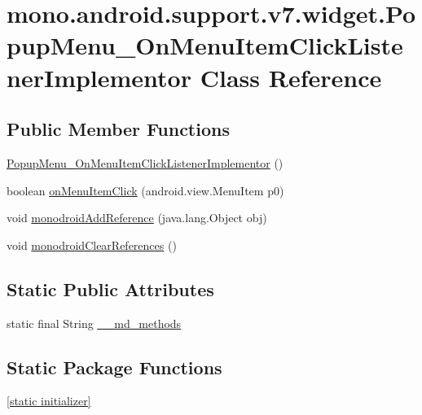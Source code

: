 \hypertarget{classmono_1_1android_1_1support_1_1v7_1_1widget_1_1_popup_menu___on_menu_item_click_listener_implementor}{
\section{mono.android.support.v7.widget.PopupMenu\_\-OnMenuItemClickListenerImplementor Class Reference}
\label{classmono_1_1android_1_1support_1_1v7_1_1widget_1_1_popup_menu___on_menu_item_click_listener_implementor}
}
\subsection*{Public Member Functions}
\begin{CompactItemize}
\item 
\hyperlink{classmono_1_1android_1_1support_1_1v7_1_1widget_1_1_popup_menu___on_menu_item_click_listener_implementor_b88fbdb496d9cf5ecbbaa116db45b71d}{PopupMenu\_\-OnMenuItemClickListenerImplementor} ()
\item 
boolean \hyperlink{classmono_1_1android_1_1support_1_1v7_1_1widget_1_1_popup_menu___on_menu_item_click_listener_implementor_62249f352c854b62e49a42bc6ea79c70}{onMenuItemClick} (android.view.MenuItem p0)
\item 
void \hyperlink{classmono_1_1android_1_1support_1_1v7_1_1widget_1_1_popup_menu___on_menu_item_click_listener_implementor_10bc60fb24f62110461d25542b950567}{monodroidAddReference} (java.lang.Object obj)
\item 
void \hyperlink{classmono_1_1android_1_1support_1_1v7_1_1widget_1_1_popup_menu___on_menu_item_click_listener_implementor_fb02baf1ac72557754370a95de87f423}{monodroidClearReferences} ()
\end{CompactItemize}
\subsection*{Static Public Attributes}
\begin{CompactItemize}
\item 
static final String \hyperlink{classmono_1_1android_1_1support_1_1v7_1_1widget_1_1_popup_menu___on_menu_item_click_listener_implementor_b113cb5493bf06d8a3e01934bae2ba49}{\_\-\_\-md\_\-methods}
\end{CompactItemize}
\subsection*{Static Package Functions}
\begin{CompactItemize}
\item 
\hyperlink{classmono_1_1android_1_1support_1_1v7_1_1widget_1_1_popup_menu___on_menu_item_click_listener_implementor_ee28c07f1af1fb8a48da3419cf06d84c}{\mbox{[}static initializer\mbox{]}}
\end{CompactItemize}
